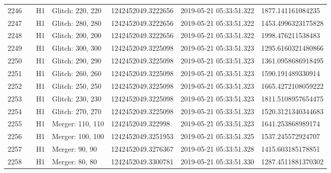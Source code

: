 \begin{longtable}{lllllll}
2246 &                                                    &       H1 &  Glitch: 220, 220 &  1242452049.3222656 &  2019-05-21 05:33:51.322 &   1877.141161084235 \\
2247 &                                                    &       H1 &  Glitch: 280, 280 &  1242452049.3222656 &  2019-05-21 05:33:51.322 &  1453.4996323175828 \\
2248 &                                                    &       H1 &  Glitch: 200, 200 &  1242452049.3222656 &  2019-05-21 05:33:51.322 &   1998.476211538483 \\
2249 &                                                    &       H1 &  Glitch: 300, 300 &  1242452049.3225098 &  2019-05-21 05:33:51.323 &  1295.6160321480866 \\
2250 &                                                    &       H1 &  Glitch: 290, 290 &  1242452049.3225098 &  2019-05-21 05:33:51.323 &  1361.0958686918495 \\
2251 &                                                    &       H1 &  Glitch: 260, 260 &  1242452049.3225098 &  2019-05-21 05:33:51.323 &   1590.191489330914 \\
2252 &                                                    &       H1 &  Glitch: 250, 250 &  1242452049.3225098 &  2019-05-21 05:33:51.323 &  1665.4272108059222 \\
2253 &                                                    &       H1 &  Glitch: 230, 230 &  1242452049.3225098 &  2019-05-21 05:33:51.323 &  1811.5108957654475 \\
2254 &                                                    &       H1 &  Glitch: 270, 270 &  1242452049.3225098 &  2019-05-21 05:33:51.323 &  1520.3121340344683 \\
2255 &                                                    &       H1 &  Merger: 110, 110 &   1242452049.322998 &  2019-05-21 05:33:51.323 &   1641.253868989174 \\
2256 &                                                    &       H1 &  Merger: 100, 100 &  1242452049.3251953 &  2019-05-21 05:33:51.325 &   1537.245572924707 \\
2257 &                                                    &       H1 &    Merger: 90, 90 &  1242452049.3276367 &  2019-05-21 05:33:51.328 &   1415.603185178851 \\
2258 &                                                    &       H1 &    Merger: 80, 80 &  1242452049.3300781 &  2019-05-21 05:33:51.330 &  1287.4511881370302 \\

\end{longtable}
